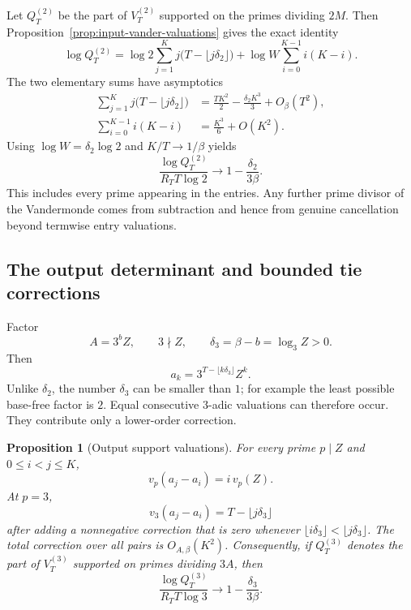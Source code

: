 \documentclass[11pt,oneside]{article}
\newtheorem{proposition}[theorem]{Proposition}
\theoremstyle{definition}
\theoremstyle{remark}
\begin{document}
Let $Q_T^{(2)}$ be the part of $V_T^{(2)}$ supported on the primes dividing $2M$.  Then
Proposition~\ref{prop:input-vander-valuations} gives the exact identity
\begin{equation}\label{eq:logQm-exact}
 \log Q_T^{(2)}
 =\log2\sum_{j=1}^Kj\bigl(T-\lfloor j\delta_2\rfloor\bigr)
  +\log W\sum_{i=0}^{K-1}i(K-i).
\end{equation}
The two elementary sums have asymptotics
\begin{align*}
 \sum_{j=1}^Kj\bigl(T-\lfloor j\delta_2\rfloor\bigr)
 &=\frac{TK^2}{2}-\frac{\delta_2K^3}{3}+O_\beta(T^2),\\
 \sum_{i=0}^{K-1}i(K-i)&=\frac{K^3}{6}+O(K^2).
\end{align*}
Using $\log W=\delta_2\log2$ and $K/T\to1/\beta$ yields
\begin{equation}\label{eq:Qm-ratio}
 \frac{\log Q_T^{(2)}}{R_TT\log2}
 \longrightarrow
 1-\frac{\delta_2}{3\beta}.
\end{equation}
This includes every prime appearing in the entries.  Any further prime divisor of the
Vandermonde comes from subtraction and hence from genuine cancellation beyond termwise
entry valuations.

\subsection{The output determinant and bounded tie corrections}

Factor
\[
  A=3^bZ,
  \qquad 3\nmid Z,
  \qquad
  \delta_3=\beta-b=\log_3Z>0.
\]
Then
\begin{equation}\label{eq:a-delta-form}
  a_k=3^{T-\lfloor k\delta_3\rfloor}Z^k.
\end{equation}
Unlike $\delta_2$, the number $\delta_3$ can be smaller than $1$; for example the least
possible base-free factor is $2$.  Equal consecutive $3$-adic valuations can therefore occur.
They contribute only a lower-order correction.

\begin{proposition}[Output support valuations]\label{prop:output-vander-valuations}
For every prime $p\mid Z$ and $0\le i<j\le K$,
\[
  v_p(a_j-a_i)=i\,v_p(Z).
\]
At $p=3$,
\[
 v_3(a_j-a_i)=T-\lfloor j\delta_3\rfloor
\]
after adding a nonnegative correction that is zero whenever
$\lfloor i\delta_3\rfloor<\lfloor j\delta_3\rfloor$.  The total correction over all pairs is
$O_{A,\beta}(K^2)$.  Consequently, if $Q_T^{(3)}$ denotes the part of
$V_T^{(3)}$ supported on primes dividing $3A$, then
\begin{equation}\label{eq:Qa-ratio}
  \frac{\log Q_T^{(3)}}{R_TT\log3}
  \longrightarrow
  1-\frac{\delta_3}{3\beta}.
\end{equation}
\end{proposition}
\end{document}
